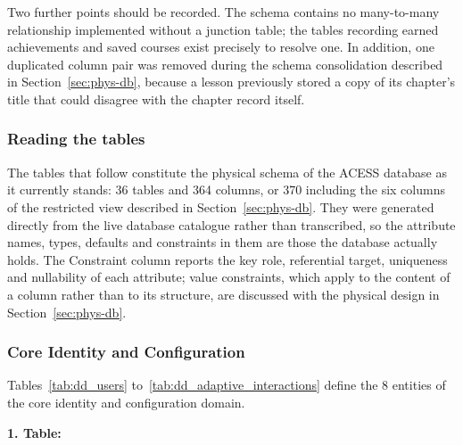 \documentclass[12pt, oneside]{article} %
\newcommand{\tcode}[1]{\path{#1}}
\begin{document}
Two further points should be recorded. The schema contains no many-to-many relationship implemented without a junction table; the tables recording earned achievements and saved courses exist precisely to resolve one. In addition, one duplicated column pair was removed during the schema consolidation described in Section~\ref{sec:phys-db}, because a lesson previously stored a copy of its chapter's title that could disagree with the chapter record itself.

\subsubsection*{Reading the tables}

The tables that follow constitute the physical schema of the ACESS database as it currently stands: 36 tables and 364 columns, or 370 including the six columns of the restricted view described in Section~\ref{sec:phys-db}. They were generated directly from the live database catalogue rather than transcribed, so the attribute names, types, defaults and constraints in them are those the database actually holds. The Constraint column reports the key role, referential target, uniqueness and nullability of each attribute; value constraints, which apply to the content of a column rather than to its structure, are discussed with the physical design in Section~\ref{sec:phys-db}.

\subsubsection{Core Identity and Configuration}

Tables~\ref{tab:dd_users} to~\ref{tab:dd_adaptive_interactions} define the 8 entities of the core identity and configuration domain.

\textbf{1. Table: \tcode{users}}
\end{document}
